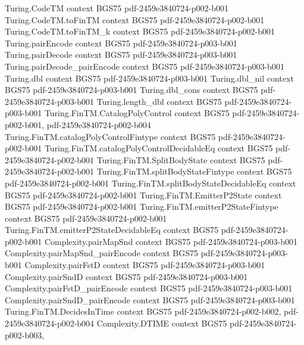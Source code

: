 \begin{theorem}
\proofstep
  {Turing.CodeTM}
  {context}
  {BGS75}
  {pdf-2459e3840724-p002-b001}
\proofstep
  {Turing.CodeTM.toFinTM}
  {context}
  {BGS75}
  {pdf-2459e3840724-p002-b001}
\proofstep
  {Turing.CodeTM.toFinTM_k}
  {context}
  {BGS75}
  {pdf-2459e3840724-p002-b001}
\proofstep
  {Turing.pairEncode}
  {context}
  {BGS75}
  {pdf-2459e3840724-p003-b001}
\proofstep
  {Turing.pairDecode}
  {context}
  {BGS75}
  {pdf-2459e3840724-p003-b001}
\proofstep
  {Turing.pairDecode_pairEncode}
  {context}
  {BGS75}
  {pdf-2459e3840724-p003-b001}
\proofstep
  {Turing.dbl}
  {context}
  {BGS75}
  {pdf-2459e3840724-p003-b001}
\proofstep
  {Turing.dbl_nil}
  {context}
  {BGS75}
  {pdf-2459e3840724-p003-b001}
\proofstep
  {Turing.dbl_cons}
  {context}
  {BGS75}
  {pdf-2459e3840724-p003-b001}
\proofstep
  {Turing.length_dbl}
  {context}
  {BGS75}
  {pdf-2459e3840724-p003-b001}
\proofstep
  {Turing.FinTM.CatalogPolyControl}
  {context}
  {BGS75}
  {pdf-2459e3840724-p002-b001,
    pdf-2459e3840724-p002-b004}
\proofstep
  {Turing.FinTM.catalogPolyControlFintype}
  {context}
  {BGS75}
  {pdf-2459e3840724-p002-b001}
\proofstep
  {Turing.FinTM.catalogPolyControlDecidableEq}
  {context}
  {BGS75}
  {pdf-2459e3840724-p002-b001}
\proofstep
  {Turing.FinTM.SplitBodyState}
  {context}
  {BGS75}
  {pdf-2459e3840724-p002-b001}
\proofstep
  {Turing.FinTM.splitBodyStateFintype}
  {context}
  {BGS75}
  {pdf-2459e3840724-p002-b001}
\proofstep
  {Turing.FinTM.splitBodyStateDecidableEq}
  {context}
  {BGS75}
  {pdf-2459e3840724-p002-b001}
\proofstep
  {Turing.FinTM.EmitterP2State}
  {context}
  {BGS75}
  {pdf-2459e3840724-p002-b001}
\proofstep
  {Turing.FinTM.emitterP2StateFintype}
  {context}
  {BGS75}
  {pdf-2459e3840724-p002-b001}
\proofstep
  {Turing.FinTM.emitterP2StateDecidableEq}
  {context}
  {BGS75}
  {pdf-2459e3840724-p002-b001}
\proofstep
  {Complexity.pairMapSnd}
  {context}
  {BGS75}
  {pdf-2459e3840724-p003-b001}
\proofstep
  {Complexity.pairMapSnd_pairEncode}
  {context}
  {BGS75}
  {pdf-2459e3840724-p003-b001}
\proofstep
  {Complexity.pairFstD}
  {context}
  {BGS75}
  {pdf-2459e3840724-p003-b001}
\proofstep
  {Complexity.pairSndD}
  {context}
  {BGS75}
  {pdf-2459e3840724-p003-b001}
\proofstep
  {Complexity.pairFstD_pairEncode}
  {context}
  {BGS75}
  {pdf-2459e3840724-p003-b001}
\proofstep
  {Complexity.pairSndD_pairEncode}
  {context}
  {BGS75}
  {pdf-2459e3840724-p003-b001}
\proofstep
  {Turing.FinTM.DecidesInTime}
  {context}
  {BGS75}
  {pdf-2459e3840724-p002-b002,
    pdf-2459e3840724-p002-b004}
\proofstep
  {Complexity.DTIME}
  {context}
  {BGS75}
  {pdf-2459e3840724-p002-b003,
}
\end{theorem}

